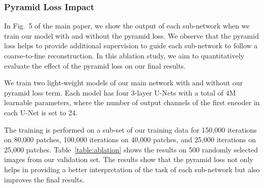 \documentclass[final]{cvpr}
\begin{document}
\begin{table}[t]
\caption{Results of our ablation study on 500 images randomly selected from our validation set. We show the effects of: (i) the pyramid loss, , and (ii) the number of Laplacian levels, , in the main network. For each experiment, we show the values of the peak signal-to-noise ratio (PSNR) and structural similarity index measure (SSIM) \cite{wang2004image}. The best PSNR/SSIM values are indicated with bold for each experiment.\vspace{-2mm}}\label{table:ablation}
\end{table}





\subsubsection{Pyramid Loss Impact} \label{subsubsec:pyramid}

In Fig.\ 5 of the main paper, we show the output of each sub-network when we train our model with and without the pyramid loss. We observe that the pyramid loss helps to provide additional supervision to guide each sub-network to follow a coarse-to-fine reconstruction. In this ablation study, we aim to quantitatively evaluate the effect of the pyramid loss on our final results. 


We train two light-weight models of our main network with and without our pyramid loss term. Each model has four 3-layer U-Nets with a total of 4M learnable parameters, where the number of output channels of the first encoder in each U-Net is set to 24. 

The training is performed on a sub-set of our training data for 150,000 iterations on 80,000  patches, 100,000 iterations on 40,000  patches, and 25,000 iterations on 25,000  patches. Table\ \ref{table:ablation} shows the results on 500 randomly selected images from our validation set. The results show that the pyramid loss not only helps in providing a better interpretation of the task of each sub-network but also improves the final results.
\end{document}
